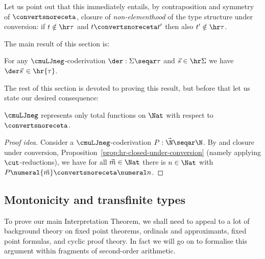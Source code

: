 Let us point out that this immediately entails, by contraposition and symmetry of $\convertsnoreceta$, closure of \emph{non-elementhood} of the type structure under conversion: if $t\notin \hr \tau$ and $t\convertsnoreceta t'$ then also $t'\notin \hr\tau$.


The main result of this section is:
\begin{theorem}
[Interpretation]
\label{thm:prog-implies-hr}
For any $\cmuLJneg$-coderivation $\der:\Sigma \seqar \tau$ and $\vec s \in \hr\Sigma$ we have $\der\vec s \, \in  \hr{ \tau}$.
\end{theorem}


The rest of this section is devoted to proving this result, but before that let us state our desired consequence:




\begin{corollary}
\label{cor:cmuLJ-represents-only-total-fns}
$\cmuLJneg$ represents only total functions on $\Nat$ with respect to $\convertsnoreceta$.
\end{corollary}
\begin{proof}
[Proof idea]
Consider a $\cmuLJneg$-coderivation $P: \vec \N \seqar \N$.
    By  and closure under conversion, Proposition~\ref{prop:hr-closed-under-conversion} (namely applying $\cut$-reductions), we have for all $\vec m \in \Nat$ there is $n\in \Nat$ with  $P\numeral{\vec m} \convertsnoreceta \numeral n$.
\end{proof}


\subsection{Montonicity and transfinite types}
\label{subsec:monotonicity-and-transfinite-types}
To prove our main Interpretation Theorem, we shall need to appeal to a lot of background theory on fixed point theorems, ordinals and approximants, fixed point formulas, and cyclic proof theory. 
In fact we will go on to formalise this argument within fragments of second-order arithmetic.




